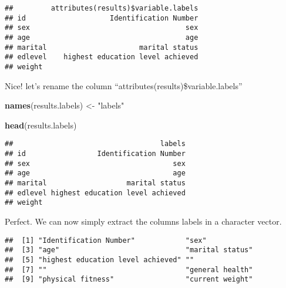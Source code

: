 \documentclass[]{article}
\newenvironment{Shaded}{\begin{snugshade}}{\end{snugshade}}
\newcommand{\CommentTok}[1]{\textcolor[rgb]{0.56,0.35,0.01}{\textit{#1}}}
\newcommand{\DecValTok}[1]{\textcolor[rgb]{0.00,0.00,0.81}{#1}}
\newcommand{\KeywordTok}[1]{\textcolor[rgb]{0.13,0.29,0.53}{\textbf{#1}}}
\newcommand{\NormalTok}[1]{#1}
\newcommand{\OperatorTok}[1]{\textcolor[rgb]{0.81,0.36,0.00}{\textbf{#1}}}
\newcommand{\StringTok}[1]{\textcolor[rgb]{0.31,0.60,0.02}{#1}}
\begin{document}
\begin{Shaded}
\end{Shaded}

\begin{verbatim}
##         attributes(results)$variable.labels
## id                    Identification Number
## sex                                     sex
## age                                     age
## marital                      marital status
## edlevel    highest education level achieved
## weight
\end{verbatim}

Nice! let's rename the column ``attributes(results)\$variable.labels''

\begin{Shaded}
\begin{Highlighting}[]
\KeywordTok{names}\NormalTok{(results.labels) <-}\StringTok{ "labels"}


\KeywordTok{head}\NormalTok{(results.labels)}
\end{Highlighting}
\end{Shaded}

\begin{verbatim}
##                                   labels
## id                 Identification Number
## sex                                  sex
## age                                  age
## marital                   marital status
## edlevel highest education level achieved
## weight
\end{verbatim}

Perfect. We can now simply extract the columns labels in a character
vector.

\begin{Shaded}
\end{Shaded}

\begin{verbatim}
##  [1] "Identification Number"            "sex"                             
##  [3] "age"                              "marital status"                  
##  [5] "highest education level achieved" ""                                
##  [7] ""                                 "general health"                  
##  [9] "physical fitness"                 "current weight"
\end{verbatim}
\end{document}
